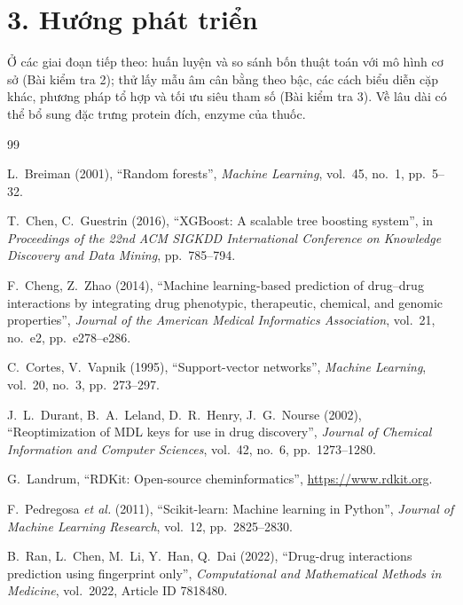 \documentclass[12pt,a4paper,oneside]{report}
\begin{document}
\section*{3. Hướng phát triển}
Ở các giai đoạn tiếp theo: huấn luyện và so sánh bốn thuật toán với mô hình cơ
sở (Bài kiểm tra 2); thử lấy mẫu âm cân bằng theo bậc, các cách biểu diễn cặp
khác, phương pháp tổ hợp và tối ưu siêu tham số (Bài kiểm tra 3). Về lâu dài có
thể bổ sung đặc trưng protein đích, enzyme của thuốc.

\begin{thebibliography}{99}
\setlength{\itemsep}{2pt}

L.~Breiman (2001), ``Random forests'', \textit{Machine Learning}, vol.~45,
no.~1, pp.~5--32.

T.~Chen, C.~Guestrin (2016), ``XGBoost: A scalable tree boosting system'',
in \textit{Proceedings of the 22nd ACM SIGKDD International Conference on
Knowledge Discovery and Data Mining}, pp.~785--794.

F.~Cheng, Z.~Zhao (2014), ``Machine learning-based prediction of drug--drug
interactions by integrating drug phenotypic, therapeutic, chemical, and genomic
properties'', \textit{Journal of the American Medical Informatics Association},
vol.~21, no.~e2, pp.~e278--e286.

C.~Cortes, V.~Vapnik (1995), ``Support-vector networks'', \textit{Machine
Learning}, vol.~20, no.~3, pp.~273--297.

J.~L.~Durant, B.~A.~Leland, D.~R.~Henry, J.~G.~Nourse (2002), ``Reoptimization
of MDL keys for use in drug discovery'', \textit{Journal of Chemical Information
and Computer Sciences}, vol.~42, no.~6, pp.~1273--1280.

G.~Landrum, ``RDKit: Open-source cheminformatics'', \url{https://www.rdkit.org}.

F.~Pedregosa \textit{et al.} (2011), ``Scikit-learn: Machine learning in
Python'', \textit{Journal of Machine Learning Research}, vol.~12,
pp.~2825--2830.

B.~Ran, L.~Chen, M.~Li, Y.~Han, Q.~Dai (2022), ``Drug-drug interactions
prediction using fingerprint only'', \textit{Computational and Mathematical
Methods in Medicine}, vol.~2022, Article ID 7818480.


\end{thebibliography}
\end{document}
